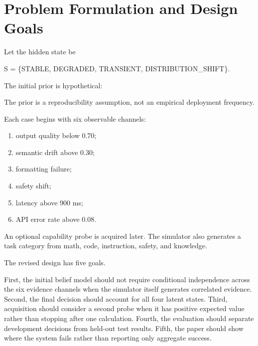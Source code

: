 \documentclass{article}
\begin{document}
\section{Problem Formulation and Design Goals}

Let the hidden state be

S = \{STABLE, DEGRADED, TRANSIENT, DISTRIBUTION\_SHIFT\}.

The initial prior is hypothetical:

\begin{table}[t]
\centering
\scriptsize
{}
\caption{Hypothetical prior over the four hidden states.}
\end{table}


The prior is a reproducibility assumption, not an empirical deployment frequency.

Each case begins with six observable channels:

\begin{enumerate}
\def\labelenumi{\arabic{enumi}.}
\item
  output quality below 0.70;
\item
  semantic drift above 0.30;
\item
  formatting failure;
\item
  safety shift;
\item
  latency above 900 ms;
\item
  API error rate above 0.08.
\end{enumerate}

An optional capability probe is acquired later. The simulator also generates a task category from math, code, instruction, safety, and knowledge.

The revised design has five goals.

First, the initial belief model should not require conditional independence across the six evidence channels when the simulator itself generates correlated evidence. Second, the final decision should account for all four latent states. Third, acquisition should consider a second probe when it has positive expected value rather than stopping after one calculation. Fourth, the evaluation should separate development decisions from held-out test results. Fifth, the paper should show where the system fails rather than reporting only aggregate success.
\end{document}
